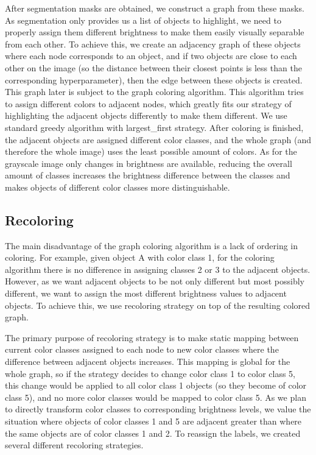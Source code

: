 After segmentation masks are obtained, we construct a graph from these masks. As segmentation only provides us a list of objects to highlight, we need to properly assign them different brightness to make them easily visually separable from each other. To achieve this, we create an adjacency graph of these objects where each node corresponds to an object, and if two objects are close to each other on the image (so the distance between their closest points is less than the corresponding hyperparameter), then the edge between these objects is created. This graph later is subject to the graph coloring algorithm. This algorithm tries to assign different colors to adjacent nodes, which greatly fits our strategy of highlighting the adjacent objects differently to make them different. We use standard greedy algorithm \cite{kubale2004graph} with largest\_first strategy. After coloring is finished, the adjacent objects are assigned different color classes, and the whole graph (and therefore the whole image) uses the least possible amount of colors. As for the grayscale image only changes in brightness are available, reducing the overall amount of classes increases the brightness difference between the classes and makes objects of different color classes more distinguishable.

\subsection{Recoloring}
\label{methods:recoloring}

The main disadvantage of the graph coloring algorithm is a lack of ordering in coloring. For example, given object A with color class 1, for the coloring algorithm there is no difference in assigning classes 2 or 3 to the adjacent objects. However, as we want adjacent objects to be not only different but most possibly different, we want to assign the most different brightness values to adjacent objects. To achieve this, we use recoloring strategy on top of the resulting colored graph.

The primary purpose of recoloring strategy is to make static mapping between current color classes assigned to each node to new color classes where the difference between adjacent objects increases. This mapping is global for the whole graph, so if the strategy decides to change color class 1 to color class 5, this change would be applied to all color class 1 objects (so they become of color class 5), and no more color classes would be mapped to color class 5. As we plan to directly transform color classes to corresponding brightness levels, we value the situation where objects of color classes 1 and 5 are adjacent greater than where the same objects are of color classes 1 and 2. To reassign the labels, we created several different recoloring strategies.

